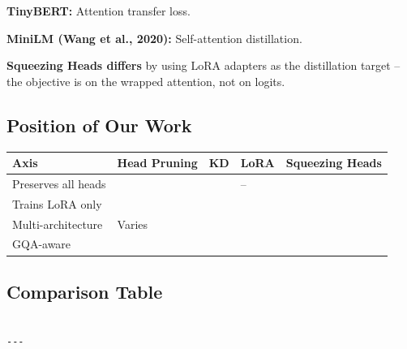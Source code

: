 \textbf{TinyBERT:} Attention transfer loss.

\textbf{MiniLM (Wang et al., 2020):} Self-attention distillation.

\textbf{Squeezing Heads differs} by using LoRA adapters as the distillation 
target -- the objective is on the wrapped attention, not on logits.

\subsection{Position of Our Work}

\begin{table}[H]
\centering
\small
\begin{tabular}{lllll}
\toprule
\textbf{Axis} & \textbf{Head Pruning} & \textbf{KD} & \textbf{LoRA} & \textbf{Squeezing Heads} \\
\midrule
Preserves all heads &  &  & -- &  \\
Trains LoRA only &  &  &  &  \\
Multi-architecture & Varies &  &  &  \\
GQA-aware &  &  &  &  \\
\bottomrule
\end{tabular}
\end{table}

\subsection{Comparison Table}

\begin{lstlisting}

---
\end{lstlisting}